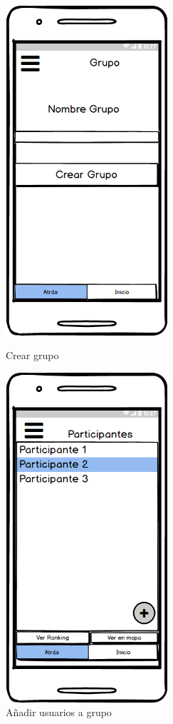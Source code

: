 	
	\begin{figure}[htbp]
\begin{minipage}[b]{0.5\linewidth} %
\centering
\includegraphics[width=6cm]{maqueta/Crear-Grupo.png}
\caption{Crear grupo}
\label{fig:crearg}
\end{minipage}
\hspace{0.5cm} %
\begin{minipage}[b]{0.5\linewidth}
\centering
\includegraphics[width=6cm]{maqueta/Ver-Miembros-grupo.png}

\caption{Añadir usuarios a grupo}
\label{fig:anadir}
\end{minipage}
\end{figure}
	
